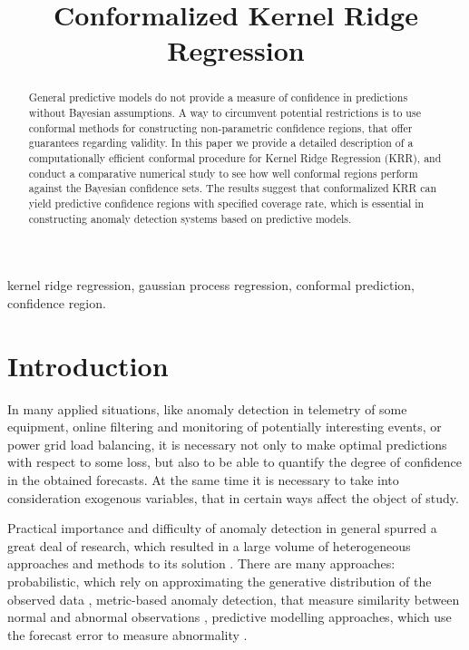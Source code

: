 \documentclass[10pt, conference, compsocconf]{IEEEtran}
\title{Conformalized Kernel Ridge Regression}
\author{
\IEEEauthorblockN{Evgeny Burnaev}
\IEEEauthorblockA{IITP RAS, Skoltech\\ Moscow, Russia\\ Email: e.burnaev@skoltech.ru}
\and
\IEEEauthorblockN{Ivan Nazarov}
\IEEEauthorblockA{IITP RAS\\ Moscow, Russia\\ Email: ivan.nazarov@iitp.ru}
}
\begin{document}
\maketitle

\begin{abstract}
General predictive models do not provide a measure of confidence in predictions
without Bayesian assumptions. A way to circumvent potential restrictions is to
use conformal methods for constructing non-parametric confidence regions, that
offer guarantees regarding validity. In this paper we provide a detailed description
of a computationally efficient conformal procedure for Kernel Ridge Regression (KRR),
and conduct a comparative numerical study to see how well conformal regions perform
against the Bayesian confidence sets. The results suggest that conformalized KRR
can yield predictive confidence regions with specified coverage rate, which is
essential in constructing anomaly detection systems based on predictive models.\\
\end{abstract}

\begin{IEEEkeywords}
kernel ridge regression, gaussian process regression, conformal prediction,
confidence region.
\end{IEEEkeywords}


\section{Introduction} %
\label{sec:introduction}

In many applied situations, like anomaly detection in telemetry of some equipment,
online filtering and monitoring of potentially interesting events, or power grid
load balancing, it is necessary not only to make optimal predictions with respect
to some loss, but also to be able to quantify the degree of confidence in the obtained
forecasts. At the same time it is necessary to take into consideration exogenous
variables, that in certain ways affect the object of study. 

Practical importance and difficulty of anomaly detection in general spurred a great
deal of research, which resulted in a large volume of heterogeneous approaches and
methods to its solution \cite{Alestra2014, Burnaev2015, Artemov2015}. There are
many approaches: probabilistic, which rely on approximating the generative distribution
of the observed data \cite{aggarwal2008, scott2015}, metric-based anomaly detection,
that measure similarity between normal and abnormal observations \cite{hautamaki2004,
breunig2000, kriegel2009}, predictive modelling approaches, which use the forecast
error to measure abnormality \cite{augusteijn2002, hawkins2002, hoffmann2007, scholkopf1998}.
\end{document}
